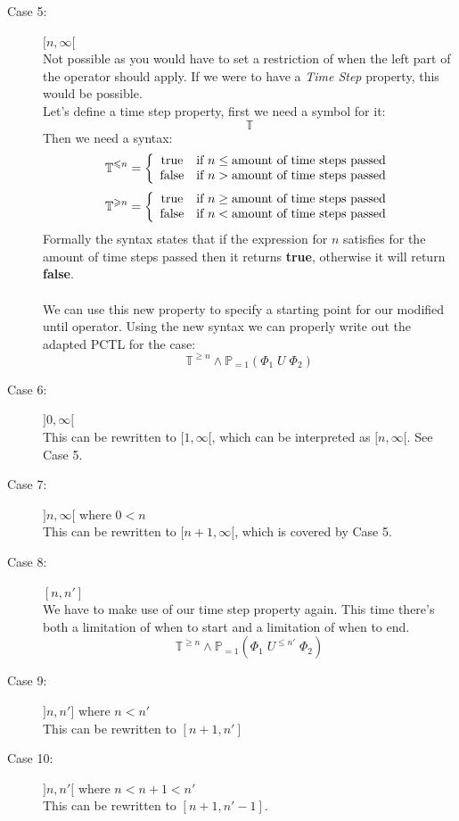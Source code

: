 \documentclass[12pt]{report}
\begin{document}
\begin{description}
	\item[Case 5:] $[n, \infty[$\\
	Not possible as you would have to set a restriction of when the left part of the operator should apply. If we were to have a \emph{Time Step} property, this would be possible.\\
	Let's define a time step property, first we need a symbol for it:
	$$\mathbb{T}$$
	Then we need a syntax:
	$$\mathbb{T}^{\leqslant n} = \left\{
		\begin{array}{c l}
			\text{true} & \text{if } n \leq \text{amount of time steps passed}\\
			\text{false} & \text{if } n > \text{amount of time steps passed}
		\end{array}
	\right.$$
	$$\mathbb{T}^{\geqslant n} = \left\{
		\begin{array}{c l}
			\text{true} & \text{if } n \geq \text{amount of time steps passed}\\
			\text{false} & \text{if } n < \text{amount of time steps passed}
		\end{array}
	\right.$$
	Formally the syntax states that if the expression for $n$ satisfies for the amount of time steps passed then it returns \textbf{true}, otherwise it will return \textbf{false}.\\
	\\
	We can use this new property to specify a starting point for our modified until operator. Using the new syntax we can properly write out the adapted PCTL for the case:
	$$\mathbb{T}^{\geqslant n} \wedge \mathbb{P}_{=1}\left(\Phi_1\;U\;\Phi_2\right)$$
	
	\item[Case 6:] $]0, \infty[$\\
	This can be rewritten to $[1, \infty[$, which can be interpreted as $[n, \infty[$. See Case 5.
	
	\item[Case 7:] $]n, \infty[$ where $0 < n$\\
	This can be rewritten to $[n+1, \infty[$, which is covered by Case 5.
	
	\item[Case 8:] $[n, n']$\\
	We have to make use of our time step property again. This time there's both a limitation of when to start and a limitation of when to end.
	$$\mathbb{T}^{\geqslant n} \wedge \mathbb{P}_{=1}\left(\Phi_1\;U^{\leqslant n'}\;\Phi_2\right)$$
	
	\item[Case 9:] $]n, n']$ where $n < n'$\\
	This can be rewritten to $[n+1, n']$
	
	\item[Case 10:] $]n, n'[$ where $n < n + 1 < n'$\\
	This can be rewritten to $[n+1, n'-1]$.
\end{description}
\end{document}
